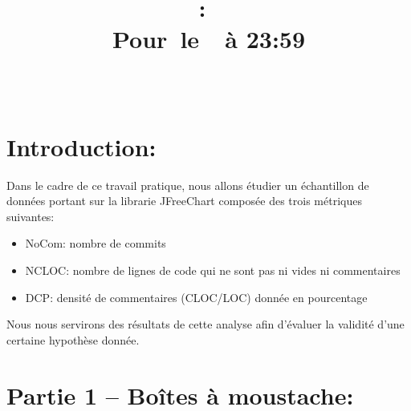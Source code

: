 \documentclass{article}
\title{
    \vspace{2in}
    \textmd{\textbf{\hmwkClass:\ \hmwkTitle}}\\
    \normalsize\vspace{0.1in}\small{Pour\ le\ \hmwkDueDate\ à 23:59 }\\
    \vspace{0.1in}\large{\textit{\hmwkClassInstructor\ \hmwkClassTime}}
    \vspace{3in}
}
\author{\hmwkAuthorName}
\date{}
\begin{document}
\maketitle
\pagebreak

\section{Introduction:}
Dans le cadre de ce travail pratique, nous allons étudier un échantillon de données portant sur la librarie JFreeChart composée des trois métriques suivantes:
\begin{itemize}
    \item NoCom: nombre de commits
    \item NCLOC: nombre de lignes de code qui ne sont pas ni vides ni commentaires
    \item DCP: densité de commentaires (CLOC/LOC) donnée en pourcentage
\end{itemize}
Nous nous servirons des résultats de cette analyse afin d'évaluer la validité d'une certaine hypothèse donnée.

\section{Partie 1 -- Boîtes à moustache:}
\end{document}
